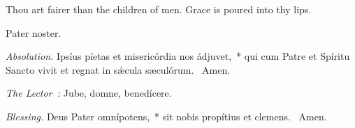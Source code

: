 {

  {
    \def\preant{\setgrefactor{17}\ifprintwhointones{\normalsize\vspace{-\baselineskip}\noindent\emph{Second Cantor intones:}

    }{}
    \large}
    \def\preantafter{\setgrefactor{17}\large}
    \def\prepsalm{\normalsize}
    \def\anttranslation{We have drunk in thy loving-kindness, O God, in the midst of thy temple.}
  }

  {
    \bigskip
    \def\preant{\setgrefactor{17}\ifprintwhointones{\normalsize\vspace{-\baselineskip}\noindent\emph{First Cantor intones:}

    }{}
    \large}
    \def\preantafter{\setgrefactor{17}\large}
    \def\prepsalm{\normalsize}
    \def\anttranslation{In the Lord's days shall abundance of peace arise and flourish.}
  }

  {
    \bigskip
    \def\preant{\setgrefactor{17}\ifprintwhointones{\noindent\emph{Second Cantor intones:}

    }{}
    \large}
    \def\preantafter{\setgrefactor{17}\large}
    \def\prepsalm{\normalsize}
    \def\anttranslation{Truth is sprung out of the earth, and righteousness hath looked down from heaven.}
  }

  \bigskip
  {
    {Thou art fairer than the children of men.}
    {Grace is poured into thy lips.}
  }

  {
    {Pater noster.}

    \emph{Absolution.} Ipsíus píetas et misericórdia nos ádjuvet,~* qui cum Patre et Spíritu Sancto vivit et regnat in sǽcula sæculórum. \Rbar{}~Amen.

    \emph{The Lector~:} Jube, domne, benedícere.

    \emph{Blessing.} Deus Pater omnípotens,~* sit nobis propítius et clemens. \Rbar{}~Amen.
  }

}
